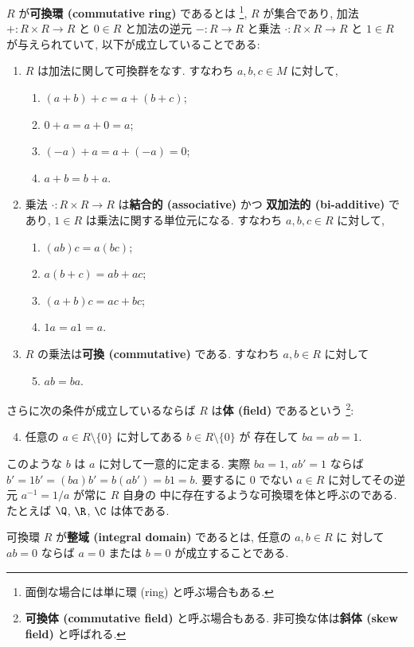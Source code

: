 \documentclass[12pt,twoside]{jarticle}
\begin{document}
$R$ が{\bf 可換環 (commutative ring)} であるとは%
\footnote{面倒な場合には単に環 (ring) と呼ぶ場合もある.},
$R$ が集合であり,
加法 $+:R\times R\to R$
と $0\in R$
と加法の逆元 $-:R\to R$
と乗法 $\cdot:R\times R\to R$
と $1\in R$ が与えられていて,
以下が成立していることである:
\begin{enumerate}
\item $R$ は加法に関して可換群をなす. すなわち $a,b,c\in M$ に対して,
  \begin{enumerate}
  \item $(a + b) + c = a + (b + c)$;
  \item $0 + a = a + 0 = a$;
  \item $(-a) + a = a + (-a) = 0$;
  \item $a + b = b + a$.
  \end{enumerate}
\item 乗法 $\cdot:R\times R\to R$ は{\bf 結合的 (associative)} かつ
  {\bf 双加法的 (bi-additive)} であり, $1\in R$ は乗法に関する単位元になる.
  すなわち $a,b,c\in R$ に対して,
  \begin{enumerate}
  \item $(ab)c = a(bc)$;
  \item $a(b + c) = ab + ac$;
  \item $(a + b)c = ac + bc$;
  \item $1a = a1 = a$.
  \end{enumerate}
\item $R$ の乗法は{\bf 可換 (commutative)} である. 
  すなわち $a,b\in R$ に対して
  \begin{enumerate}
  \setcounter{enumii}{4}
  \item $ab=ba$.
  \end{enumerate}
\end{enumerate}
さらに次の条件が成立しているならば $R$ は{\bf 体 (field)} であるという%
\footnote{{\bf 可換体 (commutative field)} と呼ぶ場合もある.
  非可換な体は{\bf 斜体 (skew field)} と呼ばれる.}:
\begin{enumerate}
  \setcounter{enumi}{3}
\item 任意の $a\in R\setminus\{0\}$ に対してある $b\in R\setminus\{0\}$ が
  存在して $ba = ab = 1$.
\end{enumerate}
このような $b$ は $a$ に対して一意的に定まる. 
実際 $ba=1$, $ab'=1$ ならば $b'=1b'=(ba)b'=b(ab')=b1=b$.
要するに $0$ でない $a\in R$ に対してその逆元 $a^{-1}=1/a$ が常に $R$ 自身の
中に存在するような可換環を体と呼ぶのである.
たとえば $\Q$, $\R$, $\C$ は体である.

可換環 $R$ が{\bf 整域 (integral domain)} であるとは, 任意の $a,b\in R$ に
対して $ab=0$ ならば $a=0$ または $b=0$ が成立することである.
\end{document}
